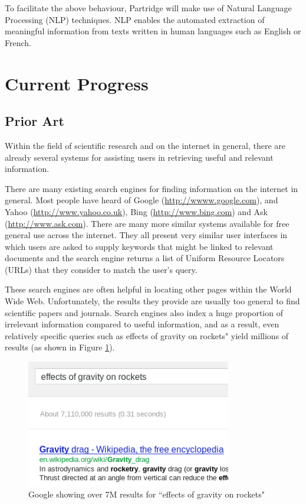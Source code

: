 \documentclass[12pt,a4paper]{article}
\begin{document}
To facilitate the above behaviour, Partridge will make use of Natural
Language Processing (NLP) techniques. NLP enables the automated extraction of
meaningful information from texts written in human languages such as English or
French. 

\section{Current Progress}

\subsection{Prior Art}

Within the field of scientific research and on the internet in general, there
are already several systems for assisting users in retrieving useful and
relevant information.

There are many existing search engines for finding information on the internet
in general. Most people have heard of Google (\url{http://wwww.google.com}),
and Yahoo (\url{http://www.yahoo.co.uk}), Bing (\url{http://www.bing.com}) and Ask
(\url{http://www.ask.com}). There are many more similar systems available for free
general use across the internet. They all present very similar user interfaces in
which users are asked to supply keywords that might be linked to relevant documents 
and the search engine returns a list of Uniform Resource Locators (URLs) that they 
consider to match the user's query. 

These search engines are often helpful in locating other pages within the World Wide
Web. Unfortunately, the results they provide are usually too general to find
scientific papers and journals. Search engines also index a huge proportion of
irrelevant information compared to useful information\cite{Berghel1997}, and as
a result, even relatively specific queries such as effects of gravity on rockets" yield
millions of results (as shown in Figure \ref{fig:rocket_results}). 

\begin{figure}[!ht]
\includegraphics[width=0.80\textwidth]{images/space_rocket_query.png}
\caption{{Google showing over 7M results for ``effects of gravity on rockets"}}
\label{fig:rocket_results}
\end{figure}
\end{document}
